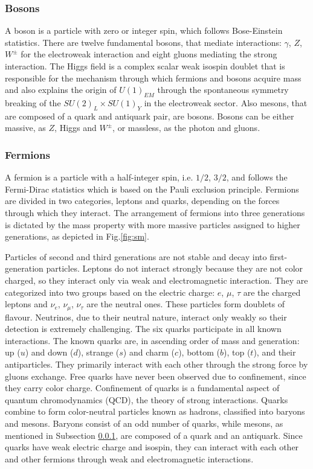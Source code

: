 \subsubsection{Bosons}\label{bosons}
A boson is a particle with zero or integer spin, which follows Bose-Einstein statistics.
There are twelve fundamental bosons, that mediate interactions: $\gamma$, $Z$, $W^{\pm}$
for the electroweak interaction and eight gluons mediating the strong interaction.
The Higgs field is a complex scalar weak isospin doublet that is 
responsible for the mechanism through which fermions and
bosons acquire mass and also explains the origin of $U (1)_{EM}$ 
through the spontaneous
symmetry breaking of the $SU (2)_L \times SU (1)_Y$ in the 
electroweak sector. Also mesons, that are composed of a quark 
and antiquark pair, are bosons. Bosons can be either massive, as $Z$, 
Higgs and $W^{\pm}$, or massless, as the photon and gluons.

\subsubsection{Fermions}
A fermion is a particle with a half-integer spin,
i.e. $1/2$, $3/2$, and follows the Fermi-Dirac statistics which is based on the Pauli exclusion principle. 
Fermions are divided in two categories, leptons and quarks, depending 
on the forces through which they interact.  The arrangement of fermions into three generations is dictated by the mass property 
with more massive particles assigned to higher generations, as 
depicted in Fig.\ref{fig:sm}.

Particles of second and third generations are not stable and decay into first-generation 
particles. Leptons do not interact strongly because they are not color charged, so they interact only via 
weak and electromagnetic interaction. They are categorized into 
two groups based on the electric charge: $e$, $\mu$, $\tau$ 
are the charged leptons and $\nu_e$, $\nu_{\mu}$, $\nu_{\tau}$ 
are the neutral ones. These particles form doublets of flavour. 
Neutrinos, due to their neutral nature, interact only weakly so 
their detection is extremely challenging. The six quarks 
participate in all known interactions. The known quarks are, 
in ascending order of mass and generation: up ($u$) and down 
($d$), strange ($s$) and charm ($c$), bottom ($b$), top ($t$), 
and their antiparticles. They primarily interact with each 
other through the strong force by gluons exchange. Free quarks 
have never been observed due to confinement, since they carry 
color charge. Confinement of quarks is a fundamental aspect of 
quantum chromodynamics (QCD), the theory of strong interactions.
Quarks combine to form color-neutral 
particles known as hadrons, classified into baryons and mesons. 
Baryons consist of an odd number of quarks, while mesons, 
as mentioned in Subsection \ref{bosons}, are composed of a quark 
and an antiquark. Since quarks have weak electric charge and 
isospin, they can interact with each other and other fermions 
through weak and electromagnetic interactions.

